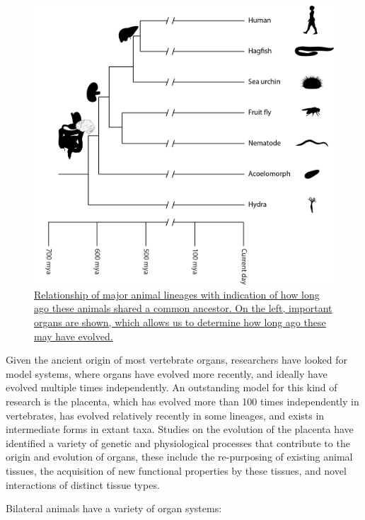 \begin{figure}

{\centering \includegraphics[width=0.7\linewidth]{./figures/animals/Origin_of_major_organs_on_the_animal_phylogeny} 

}

\caption{\href{https://commons.wikimedia.org/wiki/File:Origin_of_major_organs_on_the_animal_phylogeny.jpg}{Relationship of major animal lineages with indication of how long ago these animals shared a common ancestor. On the left, important organs are shown, which allows us to determine how long ago these may have evolved.}}\label{fig:organevolution}
\end{figure}

Given the ancient origin of most vertebrate organs, researchers have looked for model systems, where organs have evolved more recently, and ideally have evolved multiple times independently. An outstanding model for this kind of research is the placenta, which has evolved more than 100 times independently in vertebrates, has evolved relatively recently in some lineages, and exists in intermediate forms in extant taxa. Studies on the evolution of the placenta have identified a variety of genetic and physiological processes that contribute to the origin and evolution of organs, these include the re-purposing of existing animal tissues, the acquisition of new functional properties by these tissues, and novel interactions of distinct tissue types.

Bilateral animals have a variety of organ systems:

